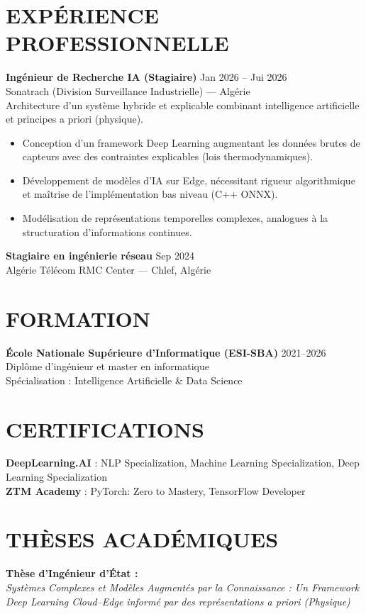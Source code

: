 \documentclass[a4paper,12pt]{article}
\begin{document}
\section{EXPÉRIENCE PROFESSIONNELLE}
\textbf{Ingénieur de Recherche IA (Stagiaire)} \hfill Jan 2026 -- Jui 2026 \\
Sonatrach (Division Surveillance Industrielle) — Algérie \\
Architecture d'un système hybride et explicable combinant intelligence artificielle et principes a priori (physique).
\begin{itemize}
    \item Conception d'un framework Deep Learning augmentant les données brutes de capteurs avec des contraintes explicables (lois thermodynamiques).
    \item Développement de modèles d'IA sur Edge, nécessitant rigueur algorithmique et maîtrise de l'implémentation bas niveau (C++ ONNX).
    \item Modélisation de représentations temporelles complexes, analogues à la structuration d'informations continues.
\end{itemize}

\textbf{Stagiaire en ingénierie réseau} \hfill Sep 2024 \\
Algérie Télécom RMC Center — Chlef, Algérie

\section{FORMATION}
\textbf{École Nationale Supérieure d’Informatique (ESI-SBA)} \hfill 2021--2026 \\
Diplôme d’ingénieur et master en informatique \\
Spécialisation : Intelligence Artificielle \& Data Science

\section{CERTIFICATIONS}
\textbf{DeepLearning.AI} : NLP Specialization, Machine Learning Specialization, Deep Learning Specialization \\[6pt]
\textbf{ZTM Academy} : PyTorch: Zero to Mastery, TensorFlow Developer


\newpage

\section{THÈSES ACADÉMIQUES}
\textbf{Thèse d'Ingénieur d'État :} \\
\textit{Systèmes Complexes et Modèles Augmentés par la Connaissance : Un Framework Deep Learning Cloud–Edge informé par des représentations a priori (Physique)}
\end{document}
